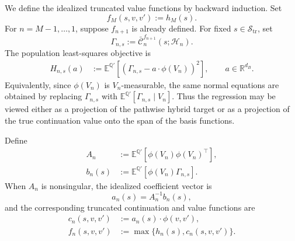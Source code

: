 \documentclass[pdflatex,sn-mathphys-num]{sn-jnl}
\theoremstyle{thmstyleone}%
\theoremstyle{thmstylethree}%
\theoremstyle{thmstyletwo}%
\newcommand{\E}{\mathbb E}
\newcommand{\Q}{\mathbb Q}
\newcommand{\R}{\mathbb R}
\begin{document}
We define the idealized truncated value functions by backward induction. Set
\[
    f_M(s,v,v'):=h_M(s).
\]
For $n=M-1,\ldots,1$, suppose $f_{n+1}$ is already defined. For fixed
$s\in\mathcal S_{\mathrm{tr}}$, set
\[
\Gamma_{n,s}
:=
\bar{\mathcal C}_n^{f_{n+1}}(s;\mathcal H_n).
\]
The population least-squares objective is
\begin{equation}
\begin{aligned}
H_{n,s}(a)
&:=
\E^{\Q'}\!\left[
    \left(
        \Gamma_{n,s}
        -
        a\cdot\phi(V_n)
    \right)^2
\right],
\qquad a\in\R^{d_B}.
\end{aligned}
\label{eq:Hns}
\end{equation}
Equivalently, since $\phi(V_n)$ is $V_n$-measurable, the same normal equations
are obtained by replacing $\Gamma_{n,s}$ with
$\E^{\Q'}[\Gamma_{n,s}\mid V_n]$. Thus the regression may be viewed either as a
projection of the pathwise hybrid target or as a projection of the true
continuation value onto the span of the basis functions.

Define
\begin{equation}
\begin{aligned}
A_n
&:=
\E^{\Q'}\!\left[
    \phi(V_n)\phi(V_n)^\top
\right],\\
b_n(s)
&:=
\E^{\Q'}\!\left[
    \phi(V_n)\Gamma_{n,s}
\right].
\end{aligned}
\label{eq:ideal_coeff_normal_eq}
\end{equation}
When $A_n$ is nonsingular, the idealized coefficient vector is
\[
    a_n(s)=A_n^{-1}b_n(s),
\]
and the corresponding truncated continuation and value functions are
\[
\begin{aligned}
    c_n(s,v,v')&:=a_n(s)\cdot\phi(v,v'),\\
    f_n(s,v,v')&:=\max\{h_n(s),c_n(s,v,v')\}.
\end{aligned}
\]
\end{document}
